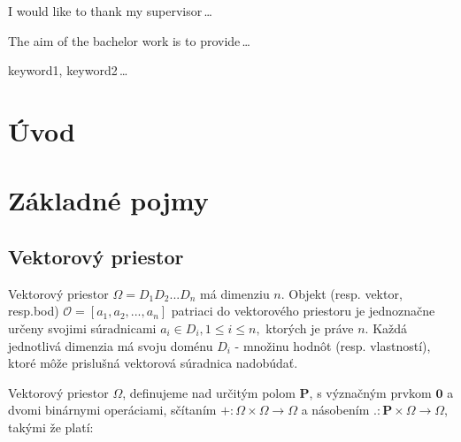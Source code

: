 \documentclass[12pt,oneside]{fithesis2}
\begin{document}
  \FrontMatter                    %
    \ThesisTitlePage                %
    \begin{ThesisDeclaration}       %
      \DeclarationText
      \AdvisorName
    \end{ThesisDeclaration}
    \begin{ThesisThanks}            %
      I would like to thank my supervisor\,\dots
    \end{ThesisThanks}
    \begin{ThesisAbstract}          %
      The aim of the bachelor work is to provide\,\dots
    \end{ThesisAbstract}
    \begin{ThesisKeyWords}          %
      keyword1, keyword2\,\dots
    \end{ThesisKeyWords}
    \tableofcontents                %
  
  \MainMatter                     %
    \chapter{Úvod}          %
    \Blindtext
    \chapter{Základné pojmy}
    
    	\section{Vektorový priestor}
    Vektorový priestor $ \Omega = D_1D_2. . .D_n $ má dimenziu $n$. Objekt (resp. vektor, resp.bod)  $\mathcal{O} = [a_1, a_2, . . . , a_n] $ patriaci do vektorového priestoru je jednoznačne určeny svojimi súradnicami $ a_i \in D_i, 1 \le i \le n, $ ktorých je práve $n$. Každá jednotlivá dimenzia má svoju doménu $D_i$ - množinu hodnôt (resp. vlastností), ktoré môže prislušná vektorová súradnica nadobúdať.
    	
    Vektorový priestor $\Omega$, definujeme nad určitým polom $\mathbf{P} $, s význačným prvkom $\mathbf{0}$ a dvomi binárnymi operáciami, sčítaním $+ : \Omega \times \Omega \rightarrow \Omega $  a násobením $. : \mathbf{P}  \times \Omega \rightarrow \Omega$, takými že platí: 
     
\end{document}
